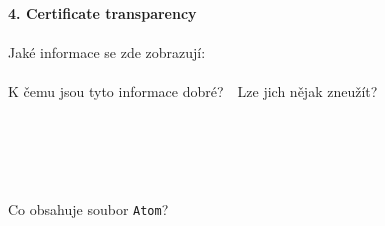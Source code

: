 \documentclass[a4paper,11pt]{article}
\begin{document}
\textbf{4. Certificate transparency} \\
~\\
Jaké informace se zde zobrazují: \underline{\hspace{8cm}}\\
~\\
K čemu jsou tyto informace dobré?~\hspace{2cm}~Lze jich nějak zneužít?
~\\
~\\
~\\
\underline{\hspace{7.5cm}}~~~~~~\underline{\hspace{8.5cm}}\\
~\\
~\\
Co obsahuje soubor \texttt{Atom}?~\underline{\hspace{12.2cm}}

\thispagestyle{empty}
\end{document}
